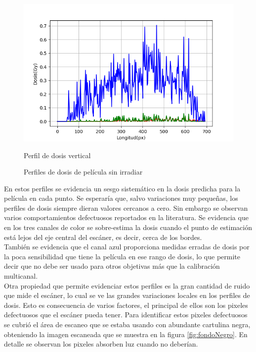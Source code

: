 \begin{figure}[ht]
\begin{minipage}[b]{0.6\linewidth}
		\centering
		\includegraphics[width=.5\linewidth]{images/perfilDosisCeroVerticalEnCentro.png} 
		\caption{Perfil de dosis vertical} 
		\vspace{4ex}
	\end{minipage} 
\caption{Perfiles de dosis de película sin irradiar}
\label{fig:perfiles} 
\end{figure}

En estos perfiles se evidencia un sesgo sistemático en la dosis predicha para la película en cada punto. Se esperaría que, salvo variaciones muy pequeñas, los perfiles de dosis siempre dieran valores cercanos a cero. Sin embargo se observan varios comportamientos defectuosos reportados en la literatura. Se evidencia que en los tres canales de color se sobre-estima la dosis cuando el punto de estimación está lejos del eje central del escáner, es decir, cerca de los bordes.\\

También se evidencia que el canal azul proporciona medidas erradas de dosis por la poca sensibilidad que tiene la película en ese rango de dosis, lo que permite decir que no debe ser usado para otros objetivas más que la calibración multicanal.\\

Otra propiedad que permite evidenciar estos perfiles es la gran cantidad de ruido que mide el escáner, lo cual se ve las grandes variaciones locales en los perfiles de dosis. Esto es consecuencia de varios factores, el principal de ellos son los pixeles defectuosos que el escáner pueda tener. Para identificar estos pixeles defectuosos se cubrió el área de escaneo que se estaba usando con abundante cartulina negra, obteniendo la imagen escaneada que se muestra en la figura \ref{fig:fondoNegro}. En detalle se observan los pixeles absorben luz cuando no deberían. \\


